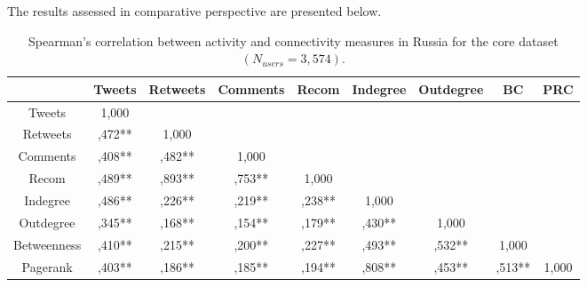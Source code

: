 The results assessed in comparative perspective are presented below.

\begin{table}[ht]%
	\centering
	\caption{Spearman’s correlation between activity and connectivity measures in Russia for the core dataset \((N_{users} = 3,574)\).}%
	\label{tab:spearmanCorrelationRussiaCore}%
	\begin{adjustbox}{width=1\textwidth}
		\small
		\begin{tabular}{ c  c  c  c  c  c  c  c  c }%
			\toprule
			& Tweets & Retweets & Comments & Recom & Indegree & Outdegree & BC & PRC \\
			\hline
			Tweets & 1,000 &  &  &  &  &  &  & \\
			Retweets & ,472** & 1,000 &  &  &  &  &  & \\
			Comments & ,408** & ,482** & 1,000 &  &  &  &  & \\
			Recom & ,489** & ,893** & ,753**  & 1,000 &  &  &  & \\
			Indegree & ,486** & ,226** & ,219** & ,238** & 1,000 &  &  & \\
			Outdegree & ,345** & ,168** & ,154** & ,179** & ,430** & 1,000 &  & \\
			Betweenness & ,410** & ,215** & ,200** & ,227** & ,493** & ,532** & 1,000 & \\
			Pagerank & ,403** & ,186** & ,185** & ,194** & ,808** & ,453** & ,513** & 1,000\\
			\bottomrule
		\end{tabular}%
	\end{adjustbox}
\end{table}


